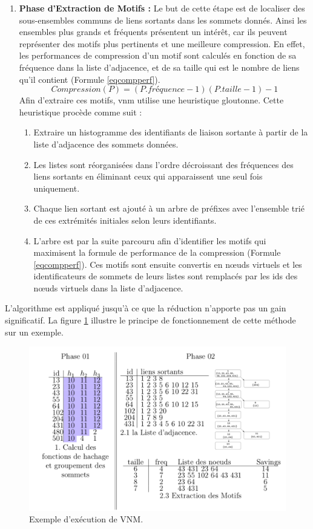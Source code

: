\begin{enumerate}
					\item \textbf{Phase d'Extraction de Motifs :}				Le but de cette étape est de localiser des sous-ensembles communs de liens sortants dans les sommets donnés. 
				Ainsi les ensembles plus grands et fréquents présentent un intérêt, car ils peuvent représenter des motifs plus pertinents et une meilleure compression. En effet, les performances de compression d'un motif sont calculés en fonction de sa fréquence dans la liste d'adjacence, et de sa taille qui est le nombre de liens qu'il contient (Formule \ref{eqcompperf}).
				\begin{equation}
				Compression(P)=(P.fréquence-1)(P.taille-1)-1
				\label{eqcompperf}
				\end{equation}
				Afin d'extraire ces motifs, \gls{vnm}  utilise une heuristique gloutonne. Cette heuristique procède comme suit :
				\begin{enumerate}
				\item Extraire un histogramme des identifiants de liaison sortante à partir de la liste d'adjacence des sommets données.
				\item Les listes sont réorganisées dans l'ordre décroissant des fréquences des liens sortants en éliminant ceux qui apparaissent une seul fois uniquement.
				\item Chaque lien sortant est ajouté à un arbre de préfixes avec l'ensemble trié de ces extrémités initiales selon leurs identifiants. 
				\item L'arbre est par la suite parcouru afin d'identifier les motifs qui maximisent la formule de performance de la compression (Formule \ref{eqcompperf}). Ces motifs sont ensuite convertis en nœuds virtuels et les identificateurs de sommets de leurs listes sont remplacés par les ids des nœuds virtuels dans la liste d'adjacence.
				\end{enumerate}
				 
				\end{enumerate}
				
				L'algorithme est appliqué jusqu'à ce que la réduction n'apporte pas un gain significatif. La figure \ref{VNM_exemple} illustre le principe de fonctionnement de cette méthode sur un exemple.
				
				
		
		
			\begin{figure}[!h]
			\includegraphics[scale=0.3,center]{./ressources/image/VNM_exemple.png}
			\caption[Exemple d'exécution de VNM .]{Exemple d'exécution de VNM.}
			\label{VNM_exemple}
	\end{figure}